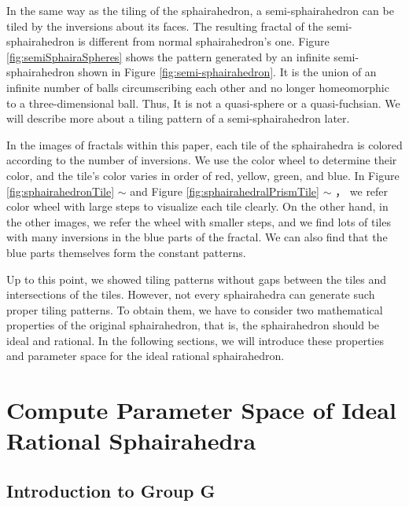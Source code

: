 \documentclass[dvipdfmx]{interact}
\theoremstyle{plain}%
\theoremstyle{definition}
\theoremstyle{remark}
\theoremstyle{problemstyle}
\begin{document}
In the same way as the tiling of the sphairahedron, a semi-sphairahedron
can be tiled by the inversions about its faces.
The resulting fractal of the semi-sphairahedron is different from normal
sphairahedron's one.
Figure \ref{fig:semiSphairaSpheres} shows the pattern
generated by an infinite semi-sphairahedron shown in Figure 
\ref{fig:semi-sphairahedron}.
It is the union of an infinite number of balls
circumscribing each other and no longer homeomorphic
to a three-dimensional ball.
Thus, It is not a quasi-sphere or a quasi-fuchsian.
We will describe more about a tiling pattern of a semi-sphairahedron later.

In the images of fractals within this paper, each tile of the
sphairahedra is colored according to the
number of inversions.
We use the color wheel to determine their color,
and the tile's color varies in order of red, yellow, green, and blue.
In Figure \ref{fig:sphairahedronTile} $\sim$  and
Figure \ref{fig:sphairahedralPrismTile} $\sim$ ，
we refer color wheel with large steps to visualize each tile clearly.
On the other hand, in the other images, we refer the wheel with smaller
steps, and we find lots of tiles with many inversions in the blue
parts of the fractal.
We can also find that the blue parts themselves form the constant
patterns.

Up to this point, we showed tiling patterns without gaps between the tiles and
intersections of the tiles.
However, not every sphairahedra can generate such proper tiling patterns.
To obtain them, we have to consider two mathematical properties
of the original sphairahedron, that is, the sphairahedron should be
ideal and rational.
In the following sections, we will introduce these properties and parameter
space for the ideal rational sphairahedron.


\section{Compute Parameter Space of Ideal Rational Sphairahedra}

\subsection{Introduction to Group G}
\end{document}

